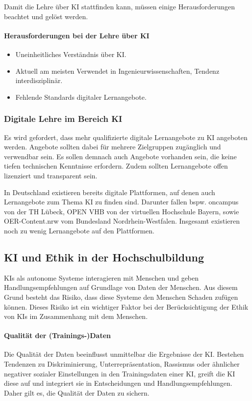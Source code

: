 Damit die Lehre über KI stattfinden kann, müssen einige Herausforderungen beachtet und gelöst werden.

\paragraph*{Herausforderungen bei der Lehre über KI}
\begin{itemize}
    \item Uneinheitliches Verständnis über KI.
    \item Aktuell am meisten Verwendet in Ingenieurwissenschaften, Tendenz interdisziplinär.
    \item Fehlende Standards digitaler Lernangebote.
\end{itemize} \cite*[S. 27]{Witt.2020}

\subsubsection*{Digitale Lehre im Bereich KI}
Es wird gefordert, dass mehr qualifizierte digitale Lernangebote zu KI angeboten werden. Angebote sollten dabei für mehrere Zielgruppen zugänglich und verwendbar sein. Es sollen demnach auch Angebote vorhanden sein, die keine tiefen technischen Kenntnisse erfordern. Zudem sollten Lernangebote offen lizenziert und transparent sein. \cite*[S. 28]{Witt.2020}

In Deutschland existieren bereits digitale Plattformen, auf denen auch Lernangebote zum Thema KI zu finden sind. Darunter fallen bspw. oncampus von der TH Lübeck, OPEN VHB von der virtuellen Hochschule Bayern, sowie OER-Content.nrw vom Bundesland Nordrhein-Westfalen. Insgesamt existieren noch zu wenig Lernangebote auf den Plattformen. \cite*[S. 28ff.]{Witt.2020}

\subsection{KI und Ethik in der Hochschulbildung}
KIs als autonome Systeme interagieren mit Menschen und geben Handlungsempfehlungen auf Grundlage von Daten der Menschen. Aus diesem Grund besteht das Risiko, dass diese Systeme den Menschen Schaden zufügen können. Dieses Risiko ist ein wichtiger Faktor bei der Berücksichtigung der Ethik von KIs im Zusammenhang mit dem Menschen. \cite*[S. 38]{Witt.2020}

\paragraph*{Qualität der (Trainings-)Daten} Die Qualität der Daten beeinflusst unmittelbar die Ergebnisse der KI. Bestehen Tendenzen zu Diskriminierung, Unterrepräsentation, Rassismus oder ähnlicher negativer sozialer Einstellungen in den Trainingsdaten einer KI, greift die KI diese auf und integriert sie in Entscheidungen und Handlungsempfehlungen. Daher gilt es, die Qualität der Daten zu sichern. \cite*[S. 39]{Witt.2020}

